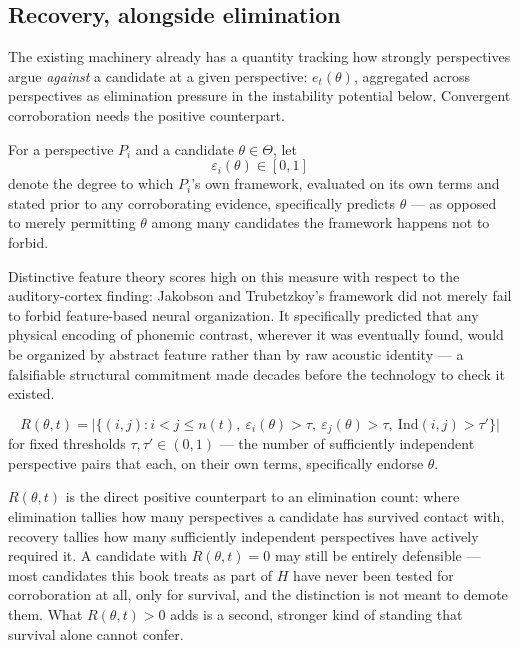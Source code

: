 \subsection{Recovery, alongside elimination}

The existing machinery already has a quantity tracking how strongly perspectives argue \emph{against} a candidate at a given perspective: $e_t(\theta)$, aggregated across perspectives as elimination pressure in the instability potential below. Convergent corroboration needs the positive counterpart.

\begin{definition}[Endorsement]
For a perspective $P_i$ and a candidate $\theta \in \Theta$, let
\[
\varepsilon_i(\theta) \in [0,1]
\]
denote the degree to which $P_i$'s own framework, evaluated on its own terms and stated prior to any corroborating evidence, specifically predicts $\theta$ --- as opposed to merely permitting $\theta$ among many candidates the framework happens not to forbid.
\end{definition}

Distinctive feature theory scores high on this measure with respect to the auditory-cortex finding: Jakobson and Trubetzkoy's framework did not merely fail to forbid feature-based neural organization. It specifically predicted that any physical encoding of phonemic contrast, wherever it was eventually found, would be organized by abstract feature rather than by raw acoustic identity --- a falsifiable structural commitment made decades before the technology to check it existed.

\begin{definition}
\[
R(\theta,t) = \bigl|\{(i,j) : i<j\le n(t),\ \varepsilon_i(\theta) > \tau,\ \varepsilon_j(\theta) > \tau,\ \mathrm{Ind}(i,j) > \tau'\}\bigr|
\]
for fixed thresholds $\tau,\tau' \in (0,1)$ --- the number of sufficiently independent perspective pairs that each, on their own terms, specifically endorse $\theta$.
\end{definition}

$R(\theta,t)$ is the direct positive counterpart to an elimination count: where elimination tallies how many perspectives a candidate has survived contact with, recovery tallies how many sufficiently independent perspectives have actively required it. A candidate with $R(\theta,t) = 0$ may still be entirely defensible --- most candidates this book treats as part of $H$ have never been tested for corroboration at all, only for survival, and the distinction is not meant to demote them. What $R(\theta,t) > 0$ adds is a second, stronger kind of standing that survival alone cannot confer.

